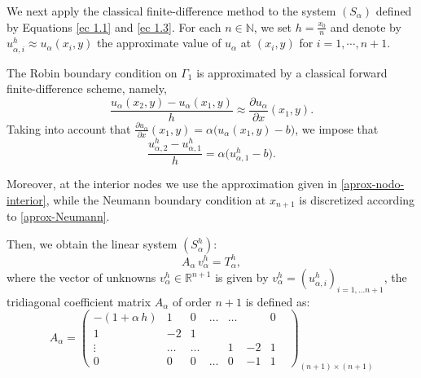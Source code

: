 \documentclass[11pt]{article}
\begin{document}
    

  We next apply the classical finite-difference method to the system $(S_\alpha)$ defined by Equations \eqref{ec 1.1} and \eqref{ec 1.3}. {For each $n\in\mathbb{N}$, we set $h=\frac{x_0}{n}$ and denote by $u^h_{\alpha,i} \approx u_\alpha(x_i,y)$ the approximate value of $u_\alpha$ at $(x_i,y)$} for $i=1,\cdots,n+1$.


The Robin boundary condition on $\Gamma_1$ is approximated by a {classical forward finite-difference scheme}, namely,
\begin{equation}
{\frac{u_\alpha(x_2,y)-u_\alpha(x_1,y)}{h}\approx \frac{\partial u_\alpha}{\partial x}(x_1,y)}.
\end{equation}
{Taking into account that $\frac{\partial u_\alpha}{\partial x}(x_1,y)
=\alpha\bigl(u_\alpha(x_1,y)-b\bigr)$, we impose that}
\begin{equation}\label{Robin-Clasica}
{\frac{{u^h_{\alpha,2}}-{u^h_{\alpha,1}}}{h}
= \alpha \bigl({u^h_{\alpha,1}}-b\bigr).}
\end{equation}

Moreover, at the interior nodes we use the approximation given in \eqref{aprox-nodo-interior}, while the Neumann boundary condition at $x_{n+1}$ is discretized according to \eqref{aprox-Neumann}.

Then, we obtain the linear system ${(S^h_{\alpha})}$:
       \[A_\alpha \, {v^h_\alpha} = {T^h_\alpha},\]
 \noindent where the vector of unknowns ${v^h_\alpha} \in  \mathbb{R}^{n+1}$ is given by ${v^h_\alpha} = ({u^h_{\alpha,i}} )_{i= 1,\ldots n+1}$,  the tridiagonal coefficient matrix  $A_\alpha$  of order $n+1$ is defined as: 
  \begin{equation}\label{matrizAalpha}
     					A_{\alpha}=\begin{pmatrix}
                                                            -(1+\alpha\,h) & 1 & 0 & \ldots & \ldots & & 0 &\\                                                                                                   
                                                             1 &-2 & 1& \\
                                                             \vdots &
                                                             \ldots & \ldots & &1 & -2 & 1\\
                                                              0 & 0& 0& \ldots &  0& -1 &1
                                                    \end{pmatrix}_{(n+1)\times (n+1)}
                                                    \end{equation}
                                                    
\end{document}
